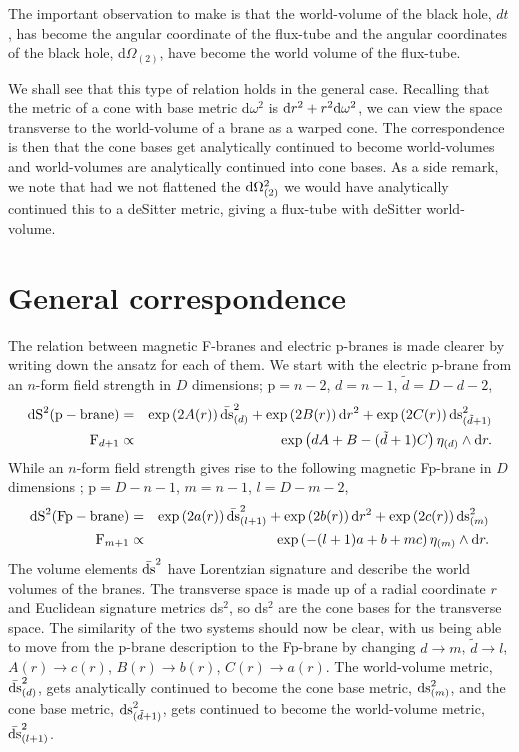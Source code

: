 \documentclass[a4paper,11pt]{article}
\begin{document}
The important observation to make is that the world-volume of the black hole,
$dt$, has become the angular coordinate of the flux-tube and the angular
coordinates of the black hole, d$\Omega_{(2)}$, have become the world volume
of the flux-tube.

We shall see that this type of relation holds in the general case. Recalling
that the metric of a cone with base metric d$\omega^2$ is 
\mbox{${\rm d}r^2+r^2{\rm d}\omega^2$}, we can view the space transverse to
the world-volume of a brane as a warped cone. The correspondence is then that
the cone bases get analytically continued to become world-volumes and 
world-volumes are analytically continued into cone bases.
As a side remark, we note that had we not flattened the
${\rm d}\Omega_{(2)}^2$ we would have analytically continued this to a
deSitter metric, giving a flux-tube with deSitter world-volume. 

\setcounter{equation}{0}
\section{General correspondence}

The relation between magnetic F-branes and electric p-branes is made
clearer by writing down the ansatz for each of them. We start with the
electric p-brane from an $n$-form field strength in $D$ dimensions; p$=n-2$,
$d=n-1$, $\tilde{d}=D-d-2$,
\begin{eqnarray}
{\rm dS}^2({\rm p-brane})&=& \exp\left(2A(r)\right)\bar{{\rm ds}}^2_{(d)}
                     +\exp\left(2B(r)\right){\rm d}r^2
                     +\exp\left(2C(r)\right){\rm ds}^2_{(\tilde{d}+1)}\\
{\rm F}_{d+1}&\propto&\exp\left(dA+B-(\tilde{d}+1)C\right)
                \eta_{(d)}\wedge{\rm d}r.
\end{eqnarray}
While an $n$-form field strength gives rise to the following 
magnetic Fp-brane in
$D$ dimensions \cite{saffin01}; \mbox{p$=D-n-1$}, $m=n-1$, $l=D-m-2$,
\begin{eqnarray}
{\rm dS}^2({\rm Fp-brane})&=& \exp\left(2a(r)\right)\bar{{\rm ds}}^2_{(l+1)}
                     +\exp\left(2b(r)\right){\rm d}r^2
                     +\exp\left(2c(r)\right){\rm ds}^2_{(m)}\\
{\rm F}_{m+1}&\propto&\exp\left(-(l+1)a+b+mc\right)
                      \eta_{(m)}\wedge{\rm d}r.
\end{eqnarray}
The volume elements $\bar{{\rm ds}}^2$ have Lorentzian signature and
describe the world volumes of the branes. The transverse space is made
up of a radial coordinate $r$ and Euclidean signature metrics ds$^2$,
so ds$^2$ are the cone bases for the transverse space.
The similarity of the two systems should now be clear, with us being
able to move from the p-brane description to the Fp-brane by 
changing $d\rightarrow m$, $\tilde{d}\rightarrow l$, 
$A(r)\rightarrow c(r)$, $B(r)\rightarrow b(r)$, $C(r)\rightarrow a(r)$.
The world-volume metric, $\bar{\rm ds}^2_{(d)}$, gets analytically
continued
to become the cone base metric, ${\rm ds}^2_{(m)}$, and the cone base
metric, ${\rm ds}^2_{(\tilde{d}+1)}$, 
gets continued to become the world-volume
metric, $\bar{\rm ds}^2_{(l+1)}$.
\end{document}
